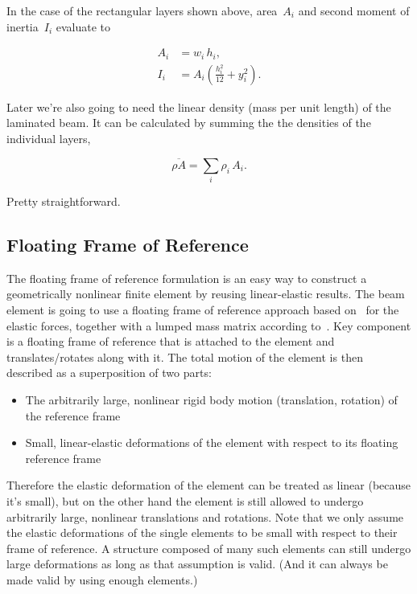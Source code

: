 In the case of the rectangular layers shown above, area~$A_i$ and second moment of inertia~$I_i$ evaluate to

\begin{align}
A_i &= w_i\,h_i,\\
I_i &= A_i\left(\frac{h_i^2}{12} + y_i^2\right).
\end{align}

Later we're also going to need the linear density (mass per unit length) of the laminated beam. It can be calculated by summing the the densities of the individual layers,

\begin{equation}
\overline{\rho A} = \sum_i \rho_i\,A_i.\label{eq:beam-linear-density}
\end{equation}

Pretty straightforward.

\newpage

\subsection{Floating Frame of Reference}

The floating frame of reference formulation is an easy way to construct a geometrically nonlinear finite element by reusing linear-elastic results.
The beam element is going to use a floating frame of reference approach based on~\cite{bib:beam_element_1} for the elastic forces, together with a lumped mass matrix according to~\cite{bib:beam_element_2}.
Key component is a floating frame of reference that is attached to the element and translates/rotates along with it.
The total motion of the element is then described as a superposition of two parts:

\begin{itemize}
\item The arbitrarily large, nonlinear rigid body motion (translation, rotation) of the reference frame
\item Small, linear-elastic deformations of the element with respect to its floating reference frame
\end{itemize}

Therefore the elastic deformation of the element can be treated as linear (because it's small), but on the other hand the element is still allowed to undergo arbitrarily large, nonlinear translations and rotations.
Note that we only assume the elastic deformations of the single elements to be small with respect to their frame of reference.
A structure composed of many such elements can still undergo large deformations as long as that assumption is valid. (And it can always be made valid by using enough elements.)

